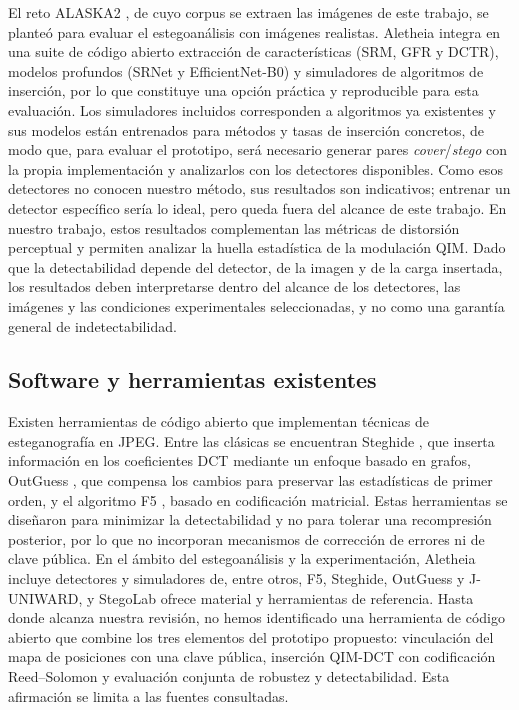 \documentclass[IB]{TFUOC}%
\begin{document}
El reto ALASKA2 \cite{cogranne2020alaska2}, de cuyo corpus se extraen las imágenes de este trabajo, se planteó para evaluar el estegoanálisis con imágenes realistas. Aletheia \cite{1} integra en una suite de código abierto extracción de características (SRM, GFR y DCTR), modelos profundos (SRNet y EfficientNet-B0) y simuladores de algoritmos de inserción, por lo que constituye una opción práctica y reproducible para esta evaluación. Los simuladores incluidos corresponden a algoritmos ya existentes y sus modelos están entrenados para métodos y tasas de inserción concretos, de modo que, para evaluar el prototipo, será necesario generar pares \textit{cover}/\textit{stego} con la propia implementación y analizarlos con los detectores disponibles. Como esos detectores no conocen nuestro método, sus resultados son indicativos; entrenar un detector específico sería lo ideal, pero queda fuera del alcance de este trabajo. En nuestro trabajo, estos resultados complementan las métricas de distorsión perceptual y permiten analizar la huella estadística de la modulación QIM. Dado que la detectabilidad depende del detector, de la imagen y de la carga insertada, los resultados deben interpretarse dentro del alcance de los detectores, las imágenes y las condiciones experimentales seleccionadas, y no como una garantía general de indetectabilidad.

\subsection{Software y herramientas existentes}
\label{subsec:software_existente}

Existen herramientas de código abierto que implementan técnicas de esteganografía en JPEG. Entre las clásicas se encuentran Steghide \cite{hetzl2005steghide}, que inserta información en los coeficientes DCT mediante un enfoque basado en grafos, OutGuess \cite{provos2001outguess}, que compensa los cambios para preservar las estadísticas de primer orden, y el algoritmo F5 \cite{westfeld2001f5}, basado en codificación matricial. Estas herramientas se diseñaron para minimizar la detectabilidad y no para tolerar una recompresión posterior, por lo que no incorporan mecanismos de corrección de errores ni de clave pública. En el ámbito del estegoanálisis y la experimentación, Aletheia \cite{1} incluye detectores y simuladores de, entre otros, F5, Steghide, OutGuess y J-UNIWARD, y StegoLab \cite{2} ofrece material y herramientas de referencia. Hasta donde alcanza nuestra revisión, no hemos identificado una herramienta de código abierto que combine los tres elementos del prototipo propuesto: vinculación del mapa de posiciones con una clave pública, inserción QIM-DCT con codificación Reed--Solomon y evaluación conjunta de robustez y detectabilidad. Esta afirmación se limita a las fuentes consultadas.
\end{document}
